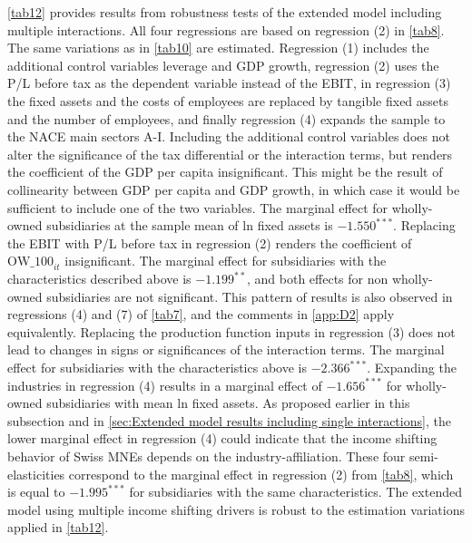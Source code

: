 \documentclass[10pt,twocolumn,oneside,cmyk]{article}
\begin{document}
\cref{tab12} provides results from robustness tests of the extended model including multiple interactions. All four regressions are based on regression (2) in \cref{tab8}. The same variations as in \cref{tab10} are estimated. Regression (1) includes the additional control variables leverage and GDP growth, regression (2) uses the P/L before tax as the dependent variable instead of the EBIT, in regression (3) the fixed assets and the costs of employees are replaced by tangible fixed assets and the number of employees, and finally regression (4) expands the sample to the NACE main sectors A-I. Including the additional control variables does not alter the significance of the tax differential or the interaction terms, but renders the coefficient of the GDP per capita insignificant. This might be the result of collinearity between GDP per capita and GDP growth, in which case it would be sufficient to include one of the two variables. The marginal effect for wholly-owned subsidiaries at the sample mean of ln fixed assets is $-1.550^{***}$. Replacing the EBIT with P/L before tax in regression (2) renders the coefficient of $\text{OW\_100}_{it}$ insignificant. The marginal effect for subsidiaries with the characteristics described above is $-1.199^{**}$, and both effects for non wholly-owned subsidiaries are not significant. This pattern of results is also observed in regressions (4) and (7) of \cref{tab7}, and the comments in \cref{app:D2} apply equivalently. Replacing the production function inputs in regression (3) does not lead to changes in signs or significances of the interaction terms. The marginal effect for subsidiaries with the characteristics above is $-2.366^{***}$. Expanding the industries in regression (4) results in a marginal effect of $-1.656^{***}$ for wholly-owned subsidiaries with mean ln fixed assets. As proposed earlier in this subsection and in \cref{sec:Extended model results including single interactions}, the lower marginal effect in regression (4) could indicate that the income shifting behavior of Swiss MNEs depends on the industry-affiliation. These four semi-elasticities correspond to the marginal effect in regression (2) from \cref{tab8}, which is equal to $-1.995^{***}$ for subsidiaries with the same characteristics. The extended model using multiple income shifting drivers is robust to the estimation variations applied in \cref{tab12}.
\end{document}
